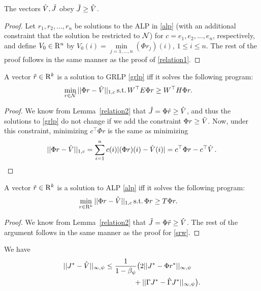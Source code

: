 \begin{lemma}\label{relation2}
The vectors $\hat{V},\tilde{J}$ obey $\tilde{J}\geq\hat{V}$.
\end{lemma}
\begin{proof}
Let $ r_1,  r_2,\ldots, r_n$ be solutions to the ALP in \eqref{alp} (with an additional constraint that the solution be restricted to $\mathcal{N}$) for $c=e_1, e_2,\ldots,e_n$, respectively,
and define $V_0\in \mathrm{R}^n$ by $V_0(i)=\underset{j=1,\ldots,n}{\min}(\Phi r_j)(i)$, $1\le i \le n$. The rest of the proof 
follows in the same manner as the proof of \cref{relation1}.
\end{proof}
\begin{lemma}\label{srw}
A vector
$\hat{r} \in \mathrm{R}^k$ is a solution to GRLP \eqref{grlp} iff it solves the following program:
\begin{align}\label{grlpeqprog}
\begin{split}
\min_{r\in \N}\, &||\Phi r-\hv||_{1,c}\,\mb
\text{s.t.}\mb \, W^\top E \Phi r\geq W^\top H \Phi r.
\end{split}
\end{align}
\end{lemma}
\begin{proof}
We know from Lemma~\ref{relation2} that $\hat{J} = \Phi \hat{r} \geq\hat{V}$, and thus
the solutions to \eqref{grlp} do not change if we add the constraint $\Phi r \ge \hat{V}$.
Now, under this constraint, minimizing $c^\top \Phi r$ is the same as minimizing 
\begin{align*}
||\Phi r-\hat{V}||_{1,c}=\sum_{i=1}^n c(i) |(\Phi r)(i)-\hat{V}(i)|=c^\top \Phi r-c^\top \hat{V}\,.
\end{align*} 
\end{proof}
\begin{lemma}\label{srwalp}
A vector
$\tilde{r} \in \mathrm{R}^k$ is a solution to ALP \eqref{alp} iff it solves the following program:
\begin{align}\label{grlpeqprog}
\begin{split}
\min_{r\in \R^k}\, &||\Phi r-\hv||_{1,c}\,\mb
\text{s.t.}\mb \, \Phi r\geq  T \Phi r.
\end{split}
\end{align}
\end{lemma}
\begin{proof}
We know from Lemma~\ref{relation2} that $\tilde{J} = \Phi \tilde{r} \geq\hat{V}$.
The rest of the argument follows in the same manner as the proof for \cref{srw}.
\end{proof}
\begin{lemma}\label{cmt1mn}
We have
\begin{align}
||J^*-\hat{V}||_{\infty,\psi}
& \leq \frac{1}{{1-\beta_{\psi}}}\big(2||J^*-\Phi r^*||_{\infty,\psi}
\nonumber\\
& {}\qquad \qquad+||\Gamma J^*-\hat{\Gamma} J^*||_{\infty,\psi}\big).
\end{align}
\end{lemma}
